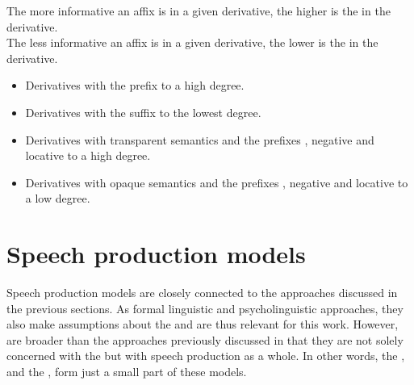 {{\noindent	The more informative an affix is in a given derivative, the higher is the  in the derivative.\\ 


	
\noindent	The less informative an affix is in a given derivative, the lower is the  in the derivative.%
	
			\begin{itemize}
				
				\item Derivatives with the prefix   to a high degree.		
				\item Derivatives with the suffix   to the lowest degree.
				\item  Derivatives with transparent semantics and the prefixes , negative  and locative   to a high degree.	
				\item  Derivatives with opaque semantics and the prefixes , negative  and locative   to a low degree.	\\
			\end{itemize}	



 
\section{Speech production models}\label{speech production models}

Speech production models are closely connected to the approaches discussed in the previous sections. As formal linguistic and psycholinguistic approaches, they also make assumptions about the  and are thus relevant for this work. However,  are broader than the approaches previously discussed in that they are not solely concerned with the  but with speech production as a whole. In other words, the , and the , form just a small part of these models.

}}

